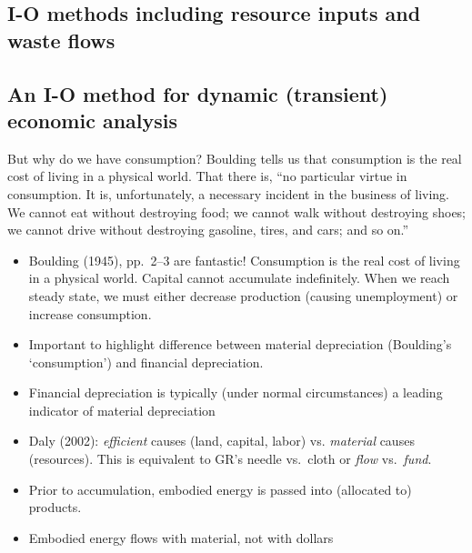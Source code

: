 \subsection{I-O methods including resource inputs and waste flows}
\label{sec:IO_waste}

\cite{Lenzen1998}\cite{ConAccount1998}\cite{Hoekstra2003}\cite{Bailey2008}
\cite{Pedersen2006}\cite{Turner2007}

\subsection{An I-O method for dynamic (transient) economic analysis}
\label{sec:IO_dynamic}

But why do we have consumption?
Boulding tells us that consumption is the 
real cost of living in a physical world.
That there is, ``no particular virtue in consumption. 
It is, unfortunately, 
a necessary incident in the business of living. 
We cannot eat without destroying food; 
we cannot walk without destroying shoes; 
we cannot drive without destroying gasoline, 
tires, and cars; and so on.''\cite[p.2]{Boulding1945}


\begin{itemize}
\item{Boulding (1945)\cite{Boulding1945}, pp.\ 2--3 are fantastic! Consumption is the real cost of living in a physical
	world. Capital cannot accumulate indefinitely.
	When we reach steady state, we must either decrease production (causing unemployment)
	or increase consumption.}
	\item{Important to highlight difference between material depreciation (Boulding's `consumption') and financial depreciation.}
	\item{Financial depreciation is typically (under normal circumstances) a leading indicator of material depreciation}
\end{itemize}

\begin{itemize}
	\item{Daly (2002)\cite{Daly2002}: \emph{efficient} causes (land, capital, labor) vs. \emph{material} causes (resources).
	This is equivalent to GR's needle vs.\ cloth or \emph{flow} vs.\ \emph{fund}.}
		\item{Prior to accumulation, embodied energy is passed into (allocated to) products.}	
	\item{Embodied energy flows with material, not with dollars}
\end{itemize}

